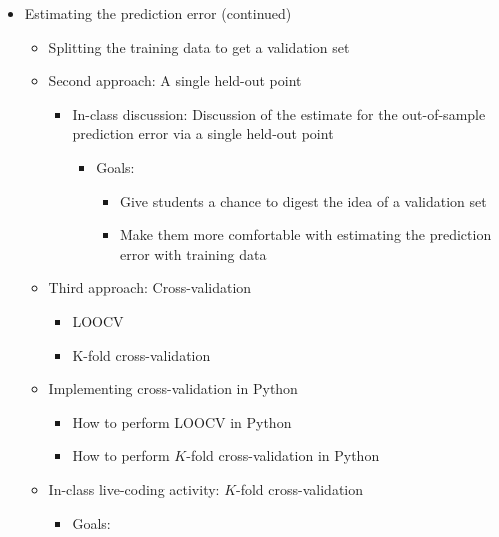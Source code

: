 \documentclass[
  letterpaper,
  DIV=11,
  numbers=noendperiod]{scrartcl}
\providecommand{\tightlist}{%
  \setlength{\itemsep}{0pt}\setlength{\parskip}{0pt}}\usepackage{longtable,booktabs,array}
\begin{document}
\begin{itemize}
\tightlist
\item
  Estimating the prediction error (continued)

  \begin{itemize}
  \tightlist
  \item
    Splitting the training data to get a validation set
  \item
    Second approach: A single held-out point

    \begin{itemize}
    \tightlist
    \item
      In-class discussion: Discussion of the estimate for the
      out-of-sample prediction error via a single held-out point

      \begin{itemize}
      \tightlist
      \item
        Goals:

        \begin{itemize}
        \tightlist
        \item
          Give students a chance to digest the idea of a validation set
        \item
          Make them more comfortable with estimating the prediction
          error with training data
        \end{itemize}
      \end{itemize}
    \end{itemize}
  \item
    Third approach: Cross-validation

    \begin{itemize}
    \tightlist
    \item
      LOOCV
    \item
      K-fold cross-validation
    \end{itemize}
  \item
    Implementing cross-validation in Python

    \begin{itemize}
    \tightlist
    \item
      How to perform LOOCV in Python
    \item
      How to perform \(K\)-fold cross-validation in Python
    \end{itemize}
  \item
    In-class live-coding activity: \(K\)-fold cross-validation

    \begin{itemize}
    \tightlist
    \item
      Goals:


\end{itemize}
\end{itemize}
\end{itemize}
\end{document}
